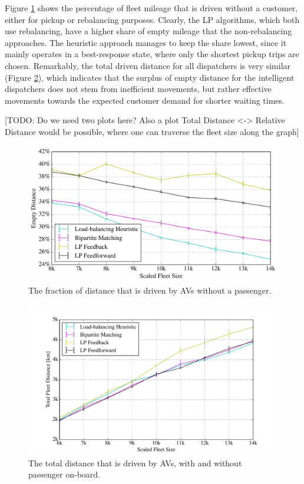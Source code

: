 Figure \ref{fig:empty_rides} shows the percentage of fleet mileage that is driven
without a customer, either for pickup or rebalancing purposes. Clearly, the LP
algorithms, which both use rebalancing, have a higher share of empty mileage
that the non-rebalancing approaches. The heuristic approach manages to keep the
share lowest, since it mainly operates in a best-response state, where only the
shortest pickup trips are chosen. Remarkably, the total driven distance for all
dispatchers is very similar (Figure \ref{fig:total_distance}), which indicates
that the surplus of empty distance for the intelligent dispatchers does not stem
from inefficient movements, but rather effective movements towards the expected
customer demand for shorter waiting times.

[TODO: Do we need two plots here? Also a plot Total Distance <-> Relative Distance
would be possible, where one can traverse the fleet size along the graph]

\begin{figure}
\includegraphics[width=1.0\textwidth]{figures/empty_rides.pdf}
\caption{The fraction of distance that is driven by AVs without a passenger.}
\label{fig:empty_rides}
\end{figure}

\begin{figure}
\includegraphics[width=1.0\textwidth]{figures/total_distance.pdf}
\caption{The total distance that is driven by AVs, with and without passenger on-board.}
\label{fig:total_distance}
\end{figure}

